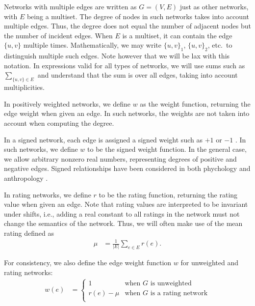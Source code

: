 \documentclass{article}
\begin{document}
Networks with multiple edges are written as $G=(V,E)$ just as other networks, with $E$ being
a multiset.  The degree of nodes in such networks takes into account
multiple edges.  Thus, the degree does not equal the number of adjacent
nodes but the number of incident edges.  When $E$ is a multiset, it can
contain the edge $\{u,v\}$ multiple times.  Mathematically, we 
may write $\{u,v\}_1$, $\{u,v\}_2$, etc.\ to distinguish multiple such
edges.   Note however that we will be lax with
this notation.  In expressions valid for all types of networks, we will
use sums such as $\sum_{\{u,v\}\in E}$ and understand that the sum
is over all edges, taking into account multiplicities. 

In positively weighted networks, we define $w$ as the
weight function, returning the edge weight when given an edge. In such
networks, the weights are not taken into account when computing the
degree. 

In a signed network, each edge is assigned a signed weight such as $+1$
or $-1$ \citep{b647}.  In such networks, we define $w$ to be the signed weight
function.  In the general case, we allow arbitrary nonzero real numbers,
representing degrees of positive and negative edges.  Signed
relationships have been considered in both phychology \citep{b862} and
anthropology \citep{b323}.  

In rating networks, we define $r$ to be
the rating function, returning the rating value when given an edge.  Note
that rating values are interpreted to be invariant under shifts, i.e.,
adding a real constant to all ratings in the network must not
change the semantics of the network.  Thus, we will often make use of
the mean rating defined as
\begin{align}
  \mu &= \frac 1 {|E|} \sum_{e\in E} r(e). 
\end{align}

For consistency, we also
define the edge weight function $w$ for unweighted and rating networks: 
\begin{align}
  w(e) &= \left\{ \begin{array}{ll} 
    1 & \text{when $G$ is unweighted} \\
    r(e)-\mu & \text{when $G$ is a rating network} \\
    \end{array} \right. 
\end{align}
\end{document}

